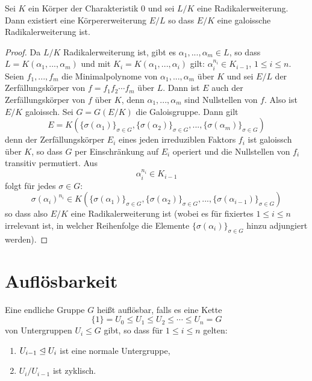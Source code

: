 \documentclass{book}
\begin{document}
\begin{lem}
    \label{lem:galoisradikal}
    Sei $K$ ein Körper der Charakteristik $0$ und sei $L/K$ eine
    Radikalerweiterung. Dann existiert eine Körpererweiterung $E/L$ so dass
    $E/K$ eine galoissche Radikalerweiterung ist. 
\end{lem}
\begin{proof}
    Da $L/K$ Radikalerweiterung ist, gibt es $\alpha_1, ..., \alpha_m \in L$,
    so dass $L = K(\alpha_1, ..., \alpha_m)$ und mit $K_i = K(\alpha_1,
    ..., \alpha_i)$ gilt: $\alpha_i^{n_i} \in K_{i-1}$, $1 \le i \le n$. Seien
    $f_1, ..., f_m$ die Minimalpolynome von $\alpha_1, ..., \alpha_m$ über $K$
    und sei $E/L$ der Zerfällungskörper von $f = f_1 f_2 \cdots f_m$ über $L$.
    Dann ist $E$ auch der Zerfällungskörper von $f$ über $K$, denn $\alpha_1,
    ..., \alpha_m$ sind Nullstellen von $f$. Also ist $E/K$ galoissch. Sei $G =
    G(E/K)$ die Galoisgruppe. Dann gilt
    \[
        E = K( \{\sigma(\alpha_1)\}_{\sigma \in G}, \{\sigma(\alpha_2)\}_{\sigma \in G}, ..., \{\sigma(\alpha_m)\}_{\sigma \in G} )
    \]
    denn der Zerfällungskörper $E_i$ eines jeden irreduziblen Faktors $f_i$ ist galoissch
    über $K$, so dass $G$ per Einschränkung auf $E_i$ operiert und die
    Nullstellen von $f_i$ transitiv permutiert. Aus 
    \[
        \alpha_i^{n_i} \in K_{i-1}
    \]
    folgt für jedes $\sigma \in G$: 
    \[
        \sigma(\alpha_i)^{n_i} \in K(\{\sigma(\alpha_1)\}_{\sigma \in G},
        \{\sigma(\alpha_2)\}_{\sigma \in G}, ...,
        \{\sigma(\alpha_{i-1})\}_{\sigma \in G})
    \]
    so dass also $E/K$ eine Radikalerweiterung ist (wobei es für
    fixiertes $1 \le i \le n$ irrelevant ist, in welcher Reihenfolge die
    Elemente $\{\sigma(\alpha_i)\}_{\sigma \in G}$ hinzu adjungiert werden). 
\end{proof}

\section{Auflösbarkeit}%
\label{sec:auflosbarkeit}

\begin{defi}
    \label{defi:auflösbar}
    Eine endliche Gruppe $G$ heißt auflösbar, falls es eine Kette 
    \begin{equation}\label{eq:kette}
        \{1\} = U_0 \le U_1  \le U_2 \le \cdots \le U_n = G
    \end{equation}
    von Untergruppen $U_i \le G$ gibt, so dass für $1 \le i \le n$ gelten:
    \begin{enumerate}
        \item $U_{i-1} \trianglelefteq U_i$ ist eine normale Untergruppe, 
        \item $U_i/U_{i-1}$ ist zyklisch. 
    \end{enumerate}
\end{defi}
\end{document}

